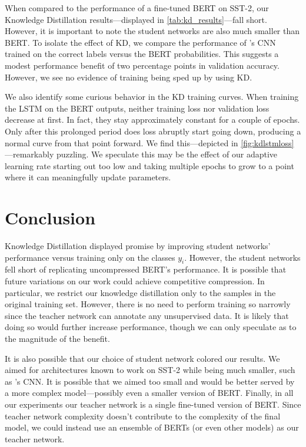 \documentclass[10pt]{article}
\begin{document}
When compared to the performance of a fine-tuned BERT on SST-2, our Knowledge
Distillation results---displayed in \cref{tab:kd_results}---fall short. However,
it is important to note the student networks are also much smaller than BERT. To
isolate the effect of KD, we compare the performance of
\citet{kim2014convolutional}'s CNN trained on the correct labels versus the BERT
probabilities. This suggests a modest performance benefit of two percentage
points in validation accuracy. However, we see no evidence of training being
sped up by using KD.

We also identify some curious behavior in the KD training curves. When training
the LSTM on the BERT outputs, neither training loss nor validation loss decrease
at first. In fact, they stay approximately constant for a couple of epochs. Only
after this prolonged period does loss abruptly start going down, producing a
normal curve from that point forward. We find this---depicted in
\cref{fig:kdlstmloss}---remarkably puzzling. We speculate this may be the
effect of our adaptive learning rate starting out too low and taking multiple
epochs to grow to a point where it can meaningfully update parameters. 

\section{Conclusion}

Knowledge Distillation displayed promise by improving student networks'
performance versus training only on the classes $y_i$. However, the student
networks fell short of replicating uncompressed BERT's performance. It is
possible that future variations on our work could achieve competitive
compression. In particular, we restrict our knowledge distillation only to the
samples in the original training set. However, there is no need to perform
training so narrowly since the teacher network can annotate any unsupervised
data. It is likely that doing so would further increase performance, though we
can only speculate as to the magnitude of the benefit.

It is also possible that our choice of student network colored our results. We
aimed for architectures known to work on SST-2 while being much smaller, such as
\citet{kim2014convolutional}'s CNN. It is possible that we aimed too small and
would be better served by a more complex model---possibly even a smaller version
of BERT. Finally, in all our experiments our teacher network is a single
fine-tuned version of BERT. Since teacher network complexity doesn't contribute
to the complexity of the final model, we could instead use an ensemble of BERTs
(or even other models) as our teacher network.
\end{document}
